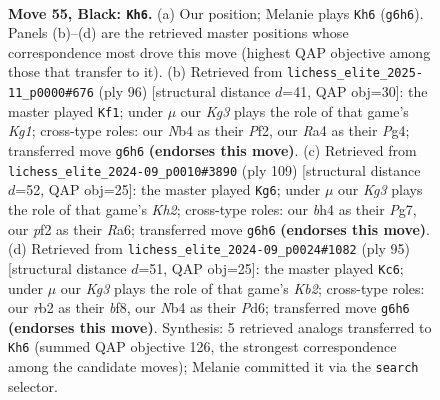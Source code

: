\documentclass[11pt]{article}
\begin{document}
\clearpage

\begin{figure}[p]\centering
\begin{subfigure}{0.46\textwidth}\centering
\resizebox{\linewidth}{!}{%
\newchessgame
\chessboard[
  setfen={1R6/3b4/2r3k1/1p6/rn4PB/4P2p/1R3P2/7K b - - 2 55},
  showmover=false,
  pgfstyle=straightmove, color=movearrow, markmove={g6-h6}
]}
\caption{}
\end{subfigure}\hfill
\begin{subfigure}{0.46\textwidth}\centering
\resizebox{\linewidth}{!}{%
\newchessgame
\chessboard[
  setfen={6b1/k1pr4/P7/1p3N1R/6P1/3p4/4rP2/3R2K1 w - - 0 49},
  showmover=false,
  pgfstyle=straightmove, color=movearrow, markmove={g1-f1}
]}
\caption{}
\end{subfigure}
\\[4pt]
\begin{subfigure}{0.46\textwidth}\centering
\resizebox{\linewidth}{!}{%
\newchessgame
\chessboard[
  setfen={8/6pk/r7/2K4p/rP6/6P1/pR5P/R7 b - - 7 55},
  showmover=false,
  pgfstyle=straightmove, color=movearrow, markmove={h7-g6}
]}
\caption{}
\end{subfigure}\hfill
\begin{subfigure}{0.46\textwidth}\centering
\resizebox{\linewidth}{!}{%
\newchessgame
\chessboard[
  setfen={5B2/1kr4p/1p1p4/4nPP1/1R2P3/4K3/8/8 b - - 2 48},
  showmover=false,
  pgfstyle=straightmove, color=movearrow, markmove={b7-c6}
]}
\caption{}
\end{subfigure}
\caption{\textbf{Move 55, Black: \texttt{Kh6}.} (a) Our position; Melanie plays \texttt{Kh6} (\texttt{g6h6}). Panels (b)--(d) are the retrieved master positions whose correspondence most drove this move (highest QAP objective among those that transfer to it). (b) Retrieved from \texttt{lichess\_elite\_2025-11\_p0000\#676} (ply 96) [structural distance $d$=41, QAP obj=30]: the master played \texttt{Kf1}; under $\mu$ our \emph{Kg3} plays the role of that game's \emph{Kg1}; cross-type roles: our \emph{N}b4 as their \emph{P}f2, our \emph{R}a4 as their \emph{P}g4; transferred move \texttt{g6h6} \textbf{(endorses this move)}. (c) Retrieved from \texttt{lichess\_elite\_2024-09\_p0010\#3890} (ply 109) [structural distance $d$=52, QAP obj=25]: the master played \texttt{Kg6}; under $\mu$ our \emph{Kg3} plays the role of that game's \emph{Kh2}; cross-type roles: our \emph{b}h4 as their \emph{P}g7, our \emph{p}f2 as their \emph{R}a6; transferred move \texttt{g6h6} \textbf{(endorses this move)}. (d) Retrieved from \texttt{lichess\_elite\_2024-09\_p0024\#1082} (ply 95) [structural distance $d$=51, QAP obj=25]: the master played \texttt{Kc6}; under $\mu$ our \emph{Kg3} plays the role of that game's \emph{Kb2}; cross-type roles: our \emph{r}b2 as their \emph{b}f8, our \emph{N}b4 as their \emph{P}d6; transferred move \texttt{g6h6} \textbf{(endorses this move)}. Synthesis: 5 retrieved analogs transferred to \texttt{Kh6} (summed QAP objective 126, the strongest correspondence among the candidate moves); Melanie committed it via the \texttt{search} selector.}
\label{fig:thought-m109}
\end{figure}
\end{document}
